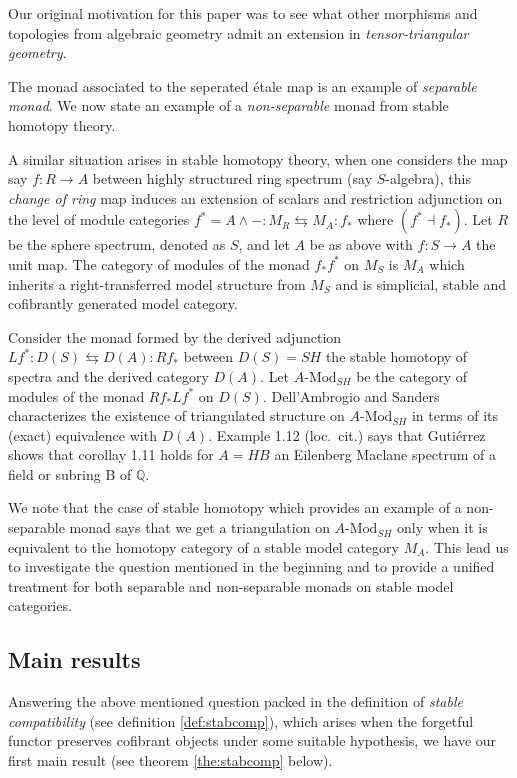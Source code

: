 \documentclass{article}
\theoremstyle{definition}
\theoremstyle{remark}
\begin{document}
Our original motivation for this paper was to see what other morphisms and topologies from algebraic geometry  admit an extension in  \textit{tensor-triangular geometry}.

The monad associated to the seperated \'etale map is an example of \textit{separable monad}. We now state an example of a \textit{non-separable} monad from stable homotopy theory.

A similar situation arises in stable homotopy theory, when one considers the map say $f: R \rightarrow A$ between highly structured ring spectrum (say \cite{MR1417719} $S$-algebra), this \textit{change of ring} map induces an extension of scalars and restriction adjunction on the level of module categories $f^{*}=A \wedge - : M_{R} \leftrightarrows M_{A}:f_{*} $ where  $(f^{*} \dashv f_{*})$. Let $R$ be the sphere spectrum, denoted as $S$, and let $A$ be as above with $f: S \rightarrow A$ the unit map. The category of modules of the monad $f_{*}f^{*}$ on $M_{S}$ is $M_{A}$ which inherits a right-transferred model structure from $M_{S}$ and is simplicial, stable and cofibrantly generated model category.

Consider the monad formed by the derived adjunction $Lf^{*}: D(S) \leftrightarrows D(A): Rf_{*}$ between $D(S)=SH$ the stable homotopy of spectra and the derived category $D(A)$. Let $A\text{-Mod}_{SH}$ be the category of modules of the monad $Rf_{*}Lf^{*}$ on $D(S)$. Dell'Ambrogio and Sanders \cite[corollary 1.11]{MR3851535} characterizes the existence of triangulated structure on $A\text{-Mod}_{SH}$ in terms of its (exact) equivalence with $D(A)$. 
Example 1.12 (loc.\ cit.) says that Guti\'errez shows that corollay 1.11 holds for  $A=HB$ an Eilenberg Maclane spectrum of a field or subring B of $\mathbb{Q}$. 
    

We note that the case of stable homotopy which provides an example of a non-separable monad says that we get a triangulation on  $A\text{-Mod}_{SH}$ only when it is equivalent to the homotopy category of a stable model category $M_{A}$. This lead us to investigate the question mentioned in the beginning and to provide a unified treatment for both separable and non-separable monads on stable model categories. 


\subsection*{Main results}
Answering the above mentioned question packed in the definition of \textit{stable compatibility} (see definition \ref{def:stabcomp}), which arises when the forgetful functor preserves cofibrant objects under some suitable hypothesis, we have our first main result (see theorem \ref{the:stabcomp} below).
 
\end{document}
